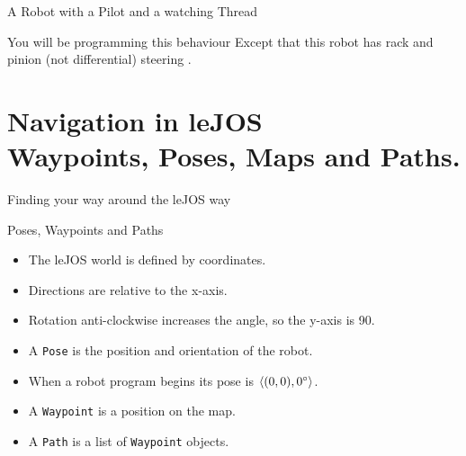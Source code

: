 \documentclass[color=pdftex,usenames,dvipsnames, aspectratio=169]{beamer}
\begin{document}
\begin{frame}{A Robot with a Pilot and a watching Thread}
\begin{center}
\href{https://youtu.be/yYER8YDCU2c}{}
\end{center}

\begin{block}{You will be programming this behaviour}
Except that this robot has rack and pinion (not differential) steering .
\end{block}
\end{frame}


\section*{Navigation in leJOS\\Waypoints, Poses, Maps and Paths.}

\begin{frame}{Finding your way around the leJOS way}
\begin{block}{Poses, Waypoints and Paths}
\begin{itemize}
  \item The leJOS world is defined by coordinates.
  \item Directions are relative to the x-axis.
  \item Rotation anti-clockwise increases the angle, so the y-axis is 90\degree.
  \item A \lstinline!Pose! is the position and orientation of the robot.
  \item When a robot program begins its pose is  $\left<(0,0), 0\degree\right>$.
  \item A \lstinline!Waypoint! is a position on the map.
  \item A \lstinline!Path! is a list of \lstinline!Waypoint! objects.
\end{itemize}
\end{block}
\end{frame}
\end{document}
